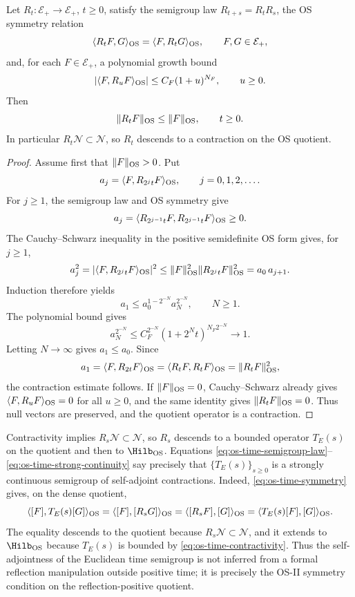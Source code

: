 \begin{proposition}
\label{prop:os-semigroup-contraction-iteration}
Let \(R_t:\mathcal E_+\to\mathcal E_+\), \(t\ge0\), satisfy the semigroup law
\(R_{t+s}=R_tR_s\), the OS symmetry relation
\[
  \langle R_tF,G\rangle_{\rm OS}
  =
  \langle F,R_tG\rangle_{\rm OS},
  \qquad F,G\in\mathcal E_+,
\]
and, for each \(F\in\mathcal E_+\), a polynomial growth bound
\[
  |\langle F,R_uF\rangle_{\rm OS}|
  \le C_F(1+u)^{N_F},
  \qquad u\ge0.
\]
Then
\[
  \|R_tF\|_{\rm OS}\le \|F\|_{\rm OS},
  \qquad t\ge0.
\]
In particular \(R_t\mathcal N\subset\mathcal N\), so \(R_t\) descends to a
contraction on the OS quotient.
\end{proposition}

\begin{proof}
Assume first that \(\|F\|_{\rm OS}>0\).  Put
\[
  a_j=\langle F,R_{2^jt}F\rangle_{\rm OS},
  \qquad j=0,1,2,\ldots .
\]
For \(j\ge1\), the semigroup law and OS symmetry give
\[
  a_j
  =
  \langle R_{2^{j-1}t}F,R_{2^{j-1}t}F\rangle_{\rm OS}
  \ge0 .
\]
The Cauchy--Schwarz inequality in the positive semidefinite OS form gives,
for \(j\ge1\),
\[
  a_j^2
  =
  |\langle F,R_{2^jt}F\rangle_{\rm OS}|^2
  \le
  \|F\|_{\rm OS}^2
  \|R_{2^jt}F\|_{\rm OS}^2
  =
  a_0\,a_{j+1}.
\]
Induction therefore yields
\[
  a_1
  \le
  a_0^{1-2^{-N}}a_N^{2^{-N}},
  \qquad N\ge1 .
\]
The polynomial bound gives
\[
  a_N^{2^{-N}}
  \le
  C_F^{2^{-N}}(1+2^Nt)^{N_F2^{-N}}
  \longrightarrow 1 .
\]
Letting \(N\to\infty\) gives \(a_1\le a_0\).  Since
\[
  a_1=\langle F,R_{2t}F\rangle_{\rm OS}
      =\langle R_tF,R_tF\rangle_{\rm OS}
      =\|R_tF\|_{\rm OS}^2,
\]
the contraction estimate follows.  If \(\|F\|_{\rm OS}=0\), Cauchy--Schwarz
already gives \(\langle F,R_uF\rangle_{\rm OS}=0\) for all \(u\ge0\), and the
same identity gives \(\|R_tF\|_{\rm OS}=0\).  Thus null vectors are preserved,
and the quotient operator is a contraction.
\end{proof}

Contractivity implies \(R_s\mathcal N\subset\mathcal N\), so \(R_s\) descends to
a bounded operator \(T_E(s)\) on the quotient and then to \(\Hilb_{\rm OS}\).
Equations
\eqref{eq:os-time-semigroup-law}--\eqref{eq:os-time-strong-continuity} say
precisely that \(\{T_E(s)\}_{s\ge0}\) is a strongly continuous semigroup of
self-adjoint contractions.
Indeed, \eqref{eq:os-time-symmetry} gives, on the dense quotient,
\[
  \langle [F],T_E(s)[G]\rangle_{\rm OS}
  =
  \langle [F],[R_sG]\rangle_{\rm OS}
  =
  \langle [R_sF],[G]\rangle_{\rm OS}
  =
  \langle T_E(s)[F],[G]\rangle_{\rm OS}.
\]
The equality descends to the quotient because \(R_s\mathcal N\subset
\mathcal N\), and it extends to \(\Hilb_{\rm OS}\) because \(T_E(s)\) is
bounded by \eqref{eq:os-time-contractivity}.  Thus the self-adjointness of
the Euclidean time semigroup is not inferred from a formal reflection
manipulation outside positive time; it is precisely the OS-II symmetry
condition on the reflection-positive quotient.

